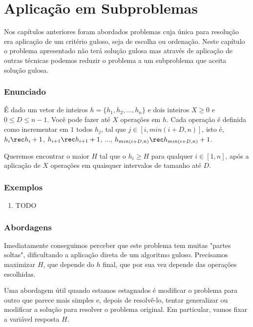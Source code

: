 \chapter{Aplicação em Subproblemas}
\label{subproblema}

Nos capítulos anteriores foram abordados problemas cuja única para resolução era aplicação de um critério guloso, seja de escolha ou ordenação. Neste capítulo o problema apresentado não terá solução gulosa mas através de aplicação de outras técnicas podemos reduzir o problema a um subproblema que aceita solução gulosa.

\subsection*{Enunciado}

É dado um vetor de inteiros $h = \{h_1, h_2, ..., h_n\}$ e dois inteiros $X \geq 0$ e $0 \leq D \leq n - 1$. Você pode fazer até $X$ operações em $h$. Cada operação é definida como incrementar em $1$ todos $h_j$, tal que $j \in [i, min(i + D, n)]$, isto é, $h_i \rec h_i + 1$, $h_{i + 1} \rec h_{i + 1} + 1$, ..., $h_{min(i + D, n)} \rec h_{min(i + D, n)} + 1$.

Queremos encontrar o maior $H$ tal que o $h_i \geq H$ para qualquer $i \in [1, n]$, após a aplicação de $X$ operações em quaisquer intervalos de tamanho até $D$.

\subsection*{Exemplos}

\begin{enumerate}
    \item TODO
\end{enumerate}

\subsection*{Abordagens}

Imediatamente conseguimos perceber que este problema tem muitas "partes soltas", dificultando a aplicação direta de um algoritmo guloso. Precisamos maximizar $H$, que depende do $h$ final, que por sua vez depende das operações escolhidas.

Uma abordagem útil quando estamos estagnados é modificar o problema para outro que parece mais simples e, depois de resolvê-lo, tentar generalizar ou modificar a solução para resolver o problema original. Em particular, vamos fixar a variável resposta $H$.

